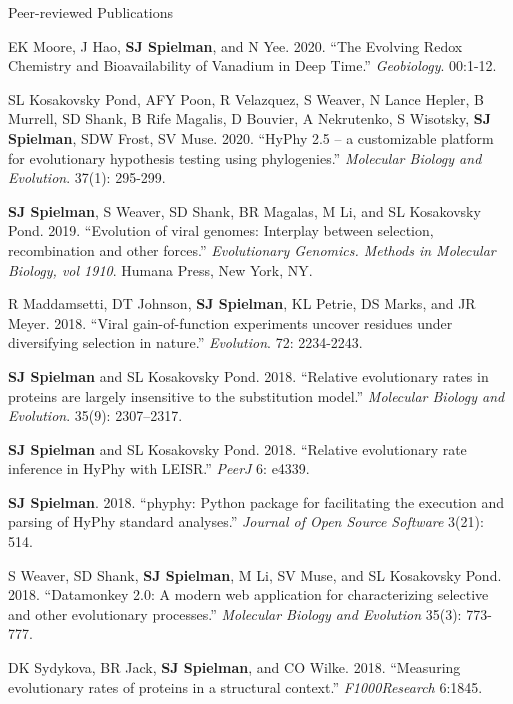 \documentclass{resume} %
\begin{document}
\begin{rSection}{Peer-reviewed Publications}
\begin{etaremune}[leftmargin=1.5em]
\item EK Moore, J Hao, \textbf{SJ Spielman}, and N Yee. 2020. ``The Evolving Redox Chemistry and Bioavailability of Vanadium in Deep Time.'' \emph{Geobiology}. 00:1-12.

\item SL Kosakovsky Pond, AFY Poon, R Velazquez, S Weaver, N Lance Hepler, B Murrell, SD Shank, B Rife Magalis, D Bouvier, A Nekrutenko, S Wisotsky, \textbf{SJ Spielman}, SDW Frost, SV Muse. 2020. ``HyPhy 2.5 – a customizable platform for evolutionary hypothesis testing using phylogenies.'' \emph{Molecular Biology and Evolution}. 37(1): 295-299.

\item \textbf{SJ Spielman}, S Weaver, SD Shank, BR Magalas, M Li, and SL Kosakovsky Pond. 2019. ``Evolution of viral genomes: Interplay between selection, recombination and other forces.'' \emph{Evolutionary Genomics. Methods in Molecular Biology, vol 1910}. Humana Press, New York, NY.

\item R Maddamsetti, DT Johnson, \textbf{SJ Spielman}, KL Petrie, DS Marks, and JR Meyer. 2018. ``Viral gain-of-function experiments uncover residues under diversifying selection in nature.'' \emph{Evolution}. 72: 2234-2243.

\item \textbf{SJ Spielman} and SL Kosakovsky Pond. 2018. ``Relative evolutionary rates in proteins are largely insensitive to the substitution model.'' \emph{Molecular Biology and Evolution}. 35(9): 2307–2317.

\item \textbf{SJ Spielman} and SL Kosakovsky Pond. 2018. ``Relative evolutionary rate inference in HyPhy with LEISR.'' \emph{PeerJ} 6: e4339.

\item \textbf{SJ Spielman}. 2018. ``phyphy: Python package for facilitating the execution and parsing of HyPhy standard analyses.''  \emph{Journal of Open Source Software} 3(21): 514.

\item S Weaver, SD Shank, \textbf{SJ Spielman}, M Li, SV Muse, and SL Kosakovsky Pond. 2018. ``Datamonkey 2.0: A modern web application for characterizing selective and other evolutionary processes.'' \emph{Molecular Biology and Evolution} 35(3): 773-777.

\item DK Sydykova, BR Jack, \textbf{SJ Spielman}, and CO Wilke. 2018. ``Measuring evolutionary rates of proteins in a structural context.'' \emph{F1000Research} 6:1845.


\end{etaremune}
\end{rSection}
\end{document}
